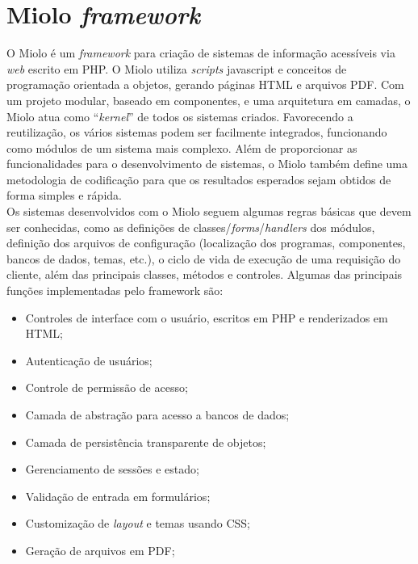 \section{Miolo \textit{framework}}
O Miolo é um \textit{framework} para criação de sistemas de informação 
acessíveis via \textit{web} escrito em PHP. O Miolo utiliza \textit{scripts} 
javascript e conceitos de programação orientada a objetos, gerando páginas HTML 
e arquivos PDF. Com um projeto modular, baseado em componentes, e uma 
arquitetura em camadas, o Miolo atua como ``\textit{kernel}'' de todos os 
sistemas criados. Favorecendo a reutilização, os vários sistemas podem ser 
facilmente integrados, funcionando como módulos de um sistema mais complexo. 
Além de proporcionar as funcionalidades para o desenvolvimento de sistemas, o 
Miolo também define uma metodologia de codificação para que os resultados 
esperados sejam obtidos de forma simples e rápida.\\
Os sistemas desenvolvidos com o Miolo seguem algumas regras básicas que devem 
ser conhecidas, como as definições de classes/\textit{forms}/\textit{handlers} 
dos módulos, definição dos arquivos de configuração (localização dos programas, 
componentes, bancos de dados, temas, etc.), o ciclo de vida de execução de uma 
requisição do cliente, além das principais classes, métodos e controles. 
Algumas das principais funções implementadas pelo framework são:
\begin{itemize}
	\item Controles de interface com o usuário, escritos em PHP e renderizados 
	em HTML;
	\item Autenticação de usuários;
	\item Controle de permissão de acesso;
	\item Camada de abstração para acesso a bancos de dados;
	\item Camada de persistência transparente de objetos;
	\item Gerenciamento de sessões e estado;
	\item Validação de entrada em formulários;
	\item Customização de \textit{layout} e temas usando CSS;
	\item Geração de arquivos em PDF;
\end{itemize}
